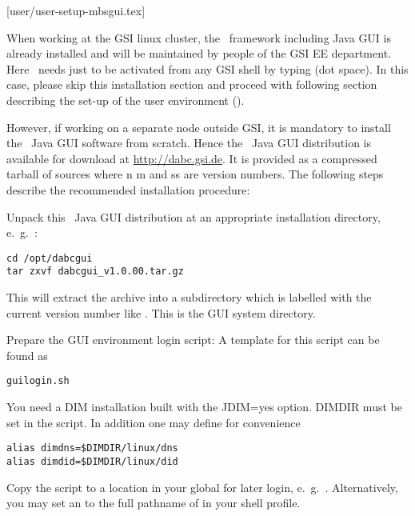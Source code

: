 [user/user-setup-mbsgui.tex]
\label{user-setup-mbsgui-chapter}

When working at the GSI linux cluster, the \dabc\ framework including Java GUI is already installed and will
be maintained by people of the GSI EE department. Here \dabc\ needs just to be
activated from any GSI shell by typing  (dot space). In this case, 
please skip this installation section and proceed with following section describing
the set-up of the user environment ().

However, if working on a separate node outside GSI, 
it is mandatory to install the \dabc\ Java GUI software
from scratch. 
Hence the \dabc\ Java GUI distribution is available for download at \hyperref{http://dabc.gsi.de}{}{}{http://dabc.gsi.de}.
It is provided as a compressed tarball of sources 
where n m and ss are version numbers.
The following steps describe the recommended installation procedure:

\bnum
\item Unpack this \dabc\ Java GUI distribution at an appropriate installation directory,
e.~g.~:
\begin{small}
\begin{verbatim}
cd /opt/dabcgui 
tar zxvf dabcgui_v1.0.00.tar.gz
\end{verbatim}
\end{small}
This will extract the archive into a subdirectory which is labelled
with the current version number like .
This is the GUI system directory.

\item Prepare the GUI environment login script:
A template for this script can be found as
\begin{small}
\begin{verbatim}
guilogin.sh
\end{verbatim}
\end{small}
You need a DIM installation built with the JDIM=yes option.
DIMDIR must be set in the script. In addition one may define for convenience
\begin{small}
\begin{verbatim}
alias dimdns=$DIMDIR/linux/dns
alias dimdid=$DIMDIR/linux/did
\end{verbatim}
\end{small}


\item Copy the script to a location in your global  for later login,
e.~g.\ . Alternatively, you
may set an  to the full pathname of  in your shell profile.

